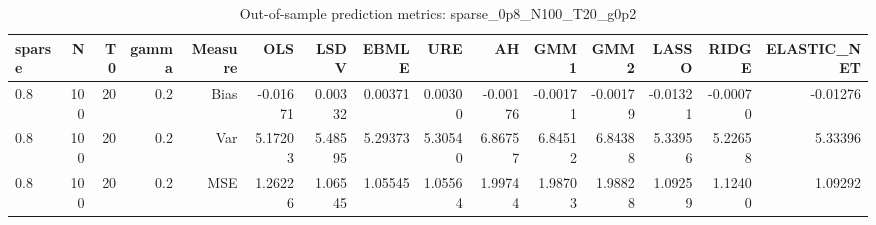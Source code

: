 \begin{table}[!htbp]\centering
\caption{Out-of-sample prediction metrics: sparse_0p8_N100_T20_g0p2}
\label{tab:table3_sparse_0p8_N100_T20_g0p2}
\begin{tabular}{lrrrrrrrrrrrrrr}
\hline
sparse & N & T0 & gamma & Measure & OLS & LSDV & EBMLE & URE & AH & GMM1 & GMM2 & LASSO & RIDGE & ELASTIC_NET \\
\hline
0.8 & 100 & 20 & 0.2 & Bias & -0.01671 & 0.00332 & 0.00371 & 0.00300 & -0.00176 & -0.00171 & -0.00179 & -0.01321 & -0.00070 & -0.01276 \\
0.8 & 100 & 20 & 0.2 & Var & 5.17203 & 5.48595 & 5.29373 & 5.30540 & 6.86757 & 6.84512 & 6.84388 & 5.33956 & 5.22658 & 5.33396 \\
0.8 & 100 & 20 & 0.2 & MSE & 1.26226 & 1.06545 & 1.05545 & 1.05564 & 1.99744 & 1.98703 & 1.98828 & 1.09259 & 1.12400 & 1.09292 \\
\hline
\end{tabular}
\end{table}

